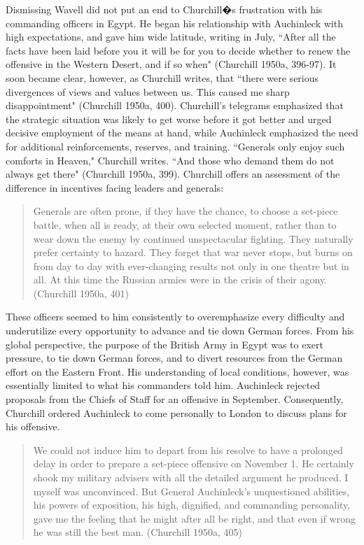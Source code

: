 \documentclass[11pt,]{article}
\begin{document}

Dismissing Wavell did not put an end to Churchill�s frustration with his commanding officers in Egypt.  He began his relationship with Auchinleck with high expectations, and gave him wide latitude, writing in July, ``After all the facts have been laid before you it will be for you to decide whether to renew the offensive in the Western Desert, and if so when" (Churchill 1950a, 396-97).  It soon became clear, however, as Churchill writes, that ``there were serious divergences of views and values between us.  This caused me sharp disappointment" (Churchill 1950a, 400).  Churchill's telegrams emphasized that the strategic situation was likely to get worse before it got better and urged decisive employment of the means at hand, while Auchinleck emphasized the need for additional reinforcements, reserves, and training.   ``Generals only enjoy such comforts in Heaven," Churchill writes.  ``And those who demand them do not always get there" (Churchill 1950a, 399).  Churchill offers an assessment of the difference in incentives facing leaders and generals:
\begin{quotation}\small\singlespace\noindent Generals are often prone, if they have the chance, to choose a set-piece battle, when all is ready, at their own selected moment, rather than to wear down the enemy by continued unspectacular fighting.  They naturally prefer certainty to hazard.  They forget that war never stops, but burns on from day to day with ever-changing results not only in one theatre but in all.  At this time the Russian armies were in the crisis of their agony. (Churchill 1950a, 401)
\end{quotation}
These officers seemed to him consistently to overemphasize every difficulty and underutilize every opportunity to advance and tie down German forces.  From his global perspective, the purpose of the British Army in Egypt was to exert pressure, to tie down German forces, and to divert resources from the German effort on the Eastern Front.  His understanding of local conditions, however, was essentially limited to what his commanders told him.  Auchinleck rejected proposals from the Chiefs of Staff for an offensive in September.  Consequently, Churchill ordered Auchinleck to come personally to London to discuss plans for his offensive.
\begin{quotation}\small\singlespace\noindent We could not induce him to depart from his resolve to have a prolonged delay in order to prepare a set-piece offensive on November 1. He certainly shook my military advisers with all the detailed argument he produced.  I myself was unconvinced.  But General Auchinleck's unquestioned abilities, his powers of exposition, his high, dignified, and commanding personality, gave me the feeling that he might after all be right, and that even if wrong he was still the best man. (Churchill 1950a, 405)
\end{quotation}
\end{document}
